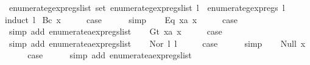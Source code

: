 \begin{isabellebody}
\isanewline
{}\isamarkupfalse%
\ enumerate{\isacharunderscore}gexp{\isacharunderscore}regs{\isacharunderscore}list{\isacharcolon}\ {\isachardoublequoteopen}set\ {\isacharparenleft}enumerate{\isacharunderscore}gexp{\isacharunderscore}regs{\isacharunderscore}list\ l{\isacharparenright}\ {\isacharequal}\ enumerate{\isacharunderscore}gexp{\isacharunderscore}regs\ l{\isachardoublequoteclose}\isanewline
%
\isadelimproof
%
\endisadelimproof
%
\isatagproof
{}\isamarkupfalse%
{\isacharparenleft}induct\ l{\isacharparenright}\isanewline
{}\isamarkupfalse%
\ {\isacharparenleft}Bc\ x{\isacharparenright}\isanewline
\ \ \isamarkupfalse%
\ \isamarkupfalse%
\ {\isacharquery}case\isanewline
\ \ \ \ \isamarkupfalse%
\ simp\isanewline
{}\isamarkupfalse%
\isanewline
\ \ \isamarkupfalse%
\ {\isacharparenleft}Eq\ x{}a\ x{}{\isacharparenright}\isanewline
\ \ \isamarkupfalse%
\ \isamarkupfalse%
\ {\isacharquery}case\isanewline
\ \ \ \ \isamarkupfalse%
\ {\isacharparenleft}simp\ add{\isacharcolon}\ enumerate{\isacharunderscore}aexp{\isacharunderscore}regs{\isacharunderscore}list{\isacharparenright}\isanewline
{}\isamarkupfalse%
\isanewline
\ \ \isamarkupfalse%
\ {\isacharparenleft}Gt\ x{}a\ x{}{\isacharparenright}\isanewline
\ \ \isamarkupfalse%
\ \isamarkupfalse%
\ {\isacharquery}case\isanewline
\ \ \ \ \isamarkupfalse%
\ {\isacharparenleft}simp\ add{\isacharcolon}\ enumerate{\isacharunderscore}aexp{\isacharunderscore}regs{\isacharunderscore}list{\isacharparenright}\isanewline
{}\isamarkupfalse%
\isanewline
\ \ \isamarkupfalse%
\ {\isacharparenleft}Nor\ l{}\ l{}{\isacharparenright}\isanewline
\ \ \isamarkupfalse%
\ \isamarkupfalse%
\ {\isacharquery}case\isanewline
\ \ \ \ \isamarkupfalse%
\ simp\isanewline
{}\isamarkupfalse%
\isanewline
\ \ \isamarkupfalse%
\ {\isacharparenleft}Null\ x{\isacharparenright}\isanewline
\ \ \isamarkupfalse%
\ \isamarkupfalse%
\ {\isacharquery}case\isanewline
\ \ \ \ \isamarkupfalse%
\ {\isacharparenleft}simp\ add{\isacharcolon}\ enumerate{\isacharunderscore}aexp{\isacharunderscore}regs{\isacharunderscore}list{\isacharparenright}\isanewline
{}\isamarkupfalse%

\end{isabellebody}
